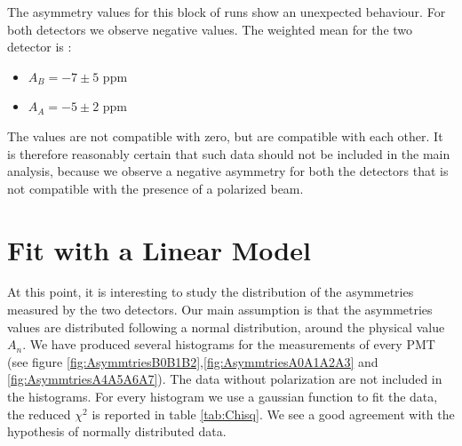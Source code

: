 The asymmetry values for this block of runs show an unexpected behaviour. For both detectors we observe negative values. The weighted mean for the two detector is :
\begin{itemize}
\item $A_{B} = -7 \pm 5$ ppm
\item $A_{A} = -5 \pm 2$ ppm
\end{itemize}

The values are not compatible with zero, but are compatible with each other. It is therefore reasonably certain that such data should not be included in the main analysis, because we observe a negative asymmetry for both the detectors that is not compatible with the presence of a polarized beam.

\section{Fit with a Linear Model}

At this point, it is interesting to study the distribution of the asymmetries measured by the two detectors. Our main assumption is that the asymmetries values are distributed following a normal distribution, around the physical value $A_{n}$. We have produced several histograms for the measurements of every PMT (see figure \ref{fig:AsymmtriesB0B1B2},\ref{fig:AsymmtriesA0A1A2A3} and \ref{fig:AsymmtriesA4A5A6A7}). The data without polarization are not included in the histograms. For every histogram we use a gaussian function to fit the data, the reduced $\chi^{2}$ is reported in table \ref{tab:Chisq}.
We see a good agreement with the hypothesis of normally distributed data.

